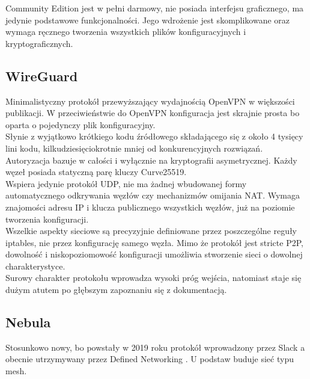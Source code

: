 Community Edition jest w pełni darmowy, nie posiada interfejsu graficznego, ma jedynie podstawowe funkcjonalności. Jego wdrożenie jest skomplikowane oraz wymaga ręcznego tworzenia wszystkich plików konfiguracyjnych i kryptograficznych.\\

\newpage
\subsection{WireGuard}

Minimalistyczny protokół przewyższający wydajnością OpenVPN w większości publikacji. W przeciwieństwie do OpenVPN konfiguracja jest skrajnie prosta bo oparta o pojedynczy plik konfiguracyjny.\\

Słynie z wyjątkowo krótkiego kodu źródłowego składającego się z około 4 tysięcy lini kodu, kilkudziesięciokrotnie mniej od konkurencyjnych rozwiązań.\\

Autoryzacja bazuje w całości i wyłącznie na kryptografii asymetrycznej. Każdy węzeł posiada statyczną parę kluczy Curve25519.\\

Wspiera jedynie protokół UDP, nie ma żadnej wbudowanej formy automatycznego odkrywania węzłów czy mechanizmów omijania NAT. Wymaga znajomości adresu IP i klucza publicznego wszystkich węzłów, już na poziomie tworzenia konfiguracji.\\

Wszelkie aspekty sieciowe są precyzyjnie definiowane przez poszczególne reguły iptables, nie przez konfigurację samego węzła. Mimo że protokół jest stricte P2P, dowolność i niskopoziomowość konfiguracji umożliwia stworzenie sieci o dowolnej charakterystyce.\\

Surowy charakter protokołu wprowadza wysoki próg wejścia, natomiast staje się dużym atutem po głębszym zapoznaniu się z dokumentacją.\\

\newpage
\subsection{Nebula}

Stosunkowo nowy, bo powstały w 2019 roku protokół wprowadzony przez Slack \cite{OEWV} a obecnie utrzymywany przez Defined Networking \cite{N7BM}. U podstaw buduje sieć typu mesh.\\

